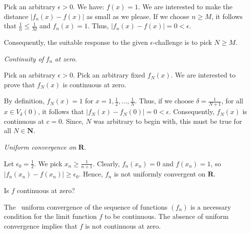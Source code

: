 \documentclass[10pt]{article}
\begin{document}
Pick an arbitrary $\displaystyle \epsilon  >0$. We have: $\displaystyle f( x) =1$. We are interested to make the distance $\displaystyle |f_{n}( x) -f( x) |$ as small as we please. If we choose $\displaystyle n\geq M$, it follows that $\displaystyle \frac{1}{n} \leq \frac{1}{M}$ and $\displaystyle f_{n}( x) =1$. Thus, $\displaystyle |f_{n}( x) -f( x) |=0< \epsilon $. 



Consequently, the suitable response to the given $\displaystyle \epsilon $-challenge is to pick $\displaystyle N\geq M$. 



\textit{Continuity of }$\displaystyle f_{n}$\textit{ at zero.}



Pick an arbitrary $\displaystyle \epsilon  >0$. Pick an arbitrary fixed $\displaystyle f_{N}( x)$. We are interested to prove that $\displaystyle f_{N}( x)$ is continuous at zero. 



By definition, $\displaystyle f_{N}( x) =1$ for $\displaystyle x=1,\frac{1}{2} ,\dotsc ,\frac{1}{N}$. Thus, if we choose $\displaystyle \delta =\frac{1}{N+1}$, for all $\displaystyle x\in V_{\delta }( 0)$, it follows that $\displaystyle |f_{N}( x) -f_{N}( 0) |=0< \epsilon $. Consequently, $\displaystyle f_{N}( x)$ is continuous at $\displaystyle c=0$. Since, $\displaystyle N$ was arbitrary to begin with, this must be true for all $\displaystyle N\in \mathbf{N}$.



\textit{Uniform convergence on }$\displaystyle \mathbf{R}$. 



Let $\displaystyle \epsilon _{0} =\frac{1}{2}$. We pick $\displaystyle x_{n} \geq \frac{1}{n+1}$. Clearly, $\displaystyle f_{n}( x_{n}) =0$ and $\displaystyle f( x_{n}) =1$, so $\displaystyle |f_{n}( x_{n}) -f( x_{n}) |\geq \epsilon _{0}$. Hence, $\displaystyle f_{n}$ is not uniformly convergent on $\displaystyle \mathbf{R}$. 



Is $\displaystyle f$ continuous at zero?



The \ uniform convergence of the sequence of functions $\displaystyle ( f_{n})$ is a necessary condition for the limit function $\displaystyle f$ to be continuous. The absence of uniform convergence implies that $\displaystyle f$ is not continuous at zero.
\end{document}
